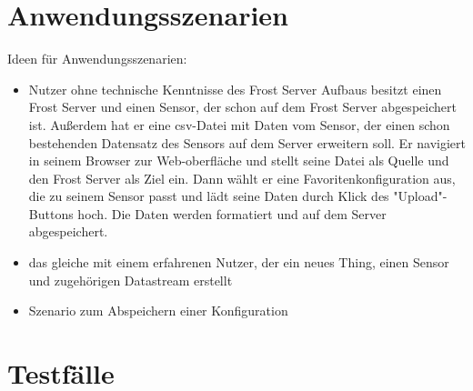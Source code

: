 \documentclass[a4paper, 12 pt]{article}
\begin{document}
	\section{Anwendungsszenarien}
	Ideen für Anwendungsszenarien:
	\begin{itemize}
		\item Nutzer ohne technische Kenntnisse des Frost Server Aufbaus besitzt einen Frost Server und einen Sensor, der schon auf dem Frost Server abgespeichert ist. Außerdem hat er eine csv-Datei mit Daten vom Sensor, der einen schon bestehenden Datensatz des Sensors auf dem Server erweitern soll. Er navigiert in seinem Browser zur Web-oberfläche und stellt seine Datei als Quelle und den Frost Server als Ziel ein. Dann wählt er eine Favoritenkonfiguration aus, die zu seinem Sensor passt und lädt seine Daten durch Klick des "Upload"-Buttons hoch. Die Daten werden formatiert und auf dem Server abgespeichert.
		\item das gleiche mit einem erfahrenen Nutzer, der ein neues Thing, einen Sensor und zugehörigen Datastream erstellt
		\item Szenario zum Abspeichern einer Konfiguration
	\end{itemize}
	
	
	\section{Testfälle}
	
\end{document}
